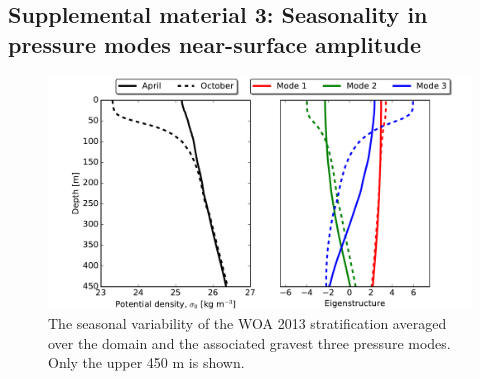 \documentclass[grl]{agutex2015}
\begin{document}
\begin{article}
\section{Supplemental material 3: Seasonality in pressure modes near-surface amplitude}

\begin{figure}[ht]
   \begin{center}
     \includegraphics[width=1.\textwidth]{figs/fig_s3.pdf}
  \caption{The seasonal variability of the WOA 2013 stratification averaged  over
  the domain and the associated gravest three pressure modes. Only the upper 450 m is shown.}
  \label{figS3}
  \end{center}
\end{figure}


%
%
%
%
%
%
%


\end{article}
\end{document}
